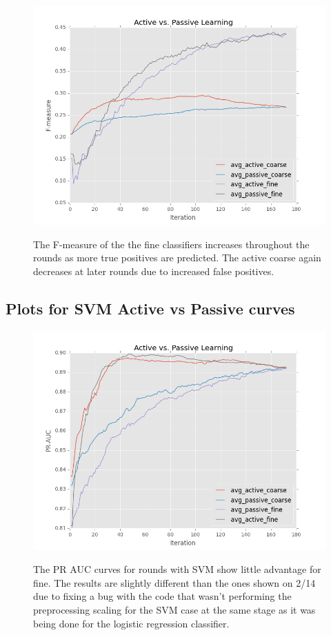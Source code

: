 \documentclass[ms]{nuthesis}
\begin{document}
\FloatBarrier
\begin{figure}[!htb]
	\centering
    \includegraphics[width=1.0\columnwidth]{fig/ActiveVsPassiveF1LR}
    \label{fig:ActiveVsPassiveF1LR}
    \caption{The F-measure of the the fine classifiers increases
throughout the rounds as more true positives are predicted. The active coarse
again decreases at later rounds due to increased false positives.}
\end{figure}
\FloatBarrier









\FloatBarrier
\subsection{Plots for SVM Active vs Passive curves}
\begin{figure}[!htb]
	\centering
    \includegraphics[width=1.0\columnwidth]{fig/ActiveVsPassivePRSVM}
    \label{fig:ActiveVsPassivePRSVM}
    \caption{The PR AUC curves for rounds with SVM show little
advantage for fine. The results are slightly different than the ones shown
on 2/14 due to fixing a bug with the code that wasn't performing the
preprocessing scaling for the SVM case at the same stage as it was being
done for the logistic regression classifier.}
\end{figure}
\FloatBarrier
\end{document}
